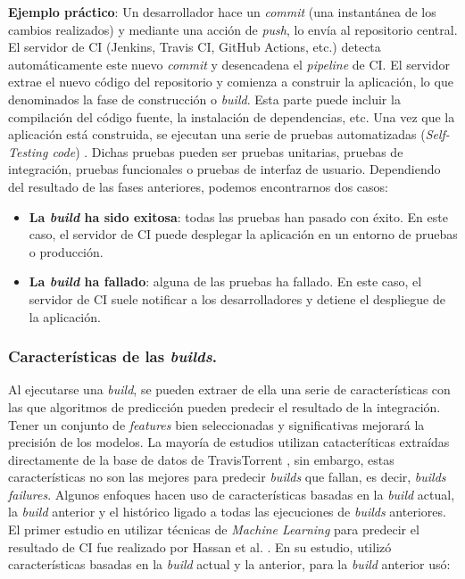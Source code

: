 \textbf{Ejemplo práctico}: Un desarrollador hace un \textit{commit} (una
instantánea de los cambios realizados) y mediante una acción de \textit{push}, lo envía al
repositorio central. El servidor de CI \cite{9} (Jenkins, Travis CI, GitHub Actions,
etc.) detecta automáticamente este nuevo \textit{commit} y desencadena el \textit{pipeline} de
CI. El servidor extrae el nuevo código del repositorio y comienza a construir la
aplicación, lo que denominados la fase de construcción o \textit{build}. Esta parte puede incluir
la compilación del código fuente, la instalación de dependencias, etc. Una vez que la aplicación
está construida, se ejecutan una serie de pruebas automatizadas (\textit{Self-Testing code})
\cite{10}. Dichas pruebas pueden ser pruebas unitarias, pruebas de integración, pruebas
funcionales o pruebas de interfaz de usuario. Dependiendo del resultado de las fases anteriores,
podemos encontrarnos dos casos:

\begin{itemize}
    \item \textbf{La \textit{build} ha sido exitosa}: todas las pruebas han pasado con éxito. En
          este caso, el servidor de CI puede desplegar la aplicación en un entorno de
          pruebas o producción.\\
    \item \textbf{La \textit{build} ha fallado}: alguna de las pruebas ha fallado. En este caso,
          el servidor de CI suele notificar a los desarrolladores y detiene el
          despliegue de la aplicación.
\end{itemize}


\subsubsection{Características de las \textit{builds}.} \label{sec:features}
Al ejecutarse una \textit{build}, se pueden extraer de ella una serie de características con las
que algoritmos de predicción pueden predecir el resultado de la integración. Tener un conjunto
de \textit{features} bien seleccionadas y significativas mejorará la precisión de los modelos.
La mayoría de estudios utilizan catacteríticas extraídas directamente de la base de datos de
TravisTorrent \cite{6}, sin embargo, estas características no son las mejores para predecir
\textit{builds} que fallan, es decir, \textit{builds failures}. Algunos enfoques \cite{6,7}
hacen uso de características basadas en la \textit{build} actual, la \textit{build} anterior y
el histórico ligado a todas las ejecuciones de \textit{builds} anteriores. El primer estudio en
utilizar técnicas de \textit{Machine Learning} para predecir el resultado de CI fue realizado por
Hassan et al. \cite{7}. En su estudio, utilizó características basadas en la \textit{build} actual y la
anterior, para la \textit{build} anterior usó:

